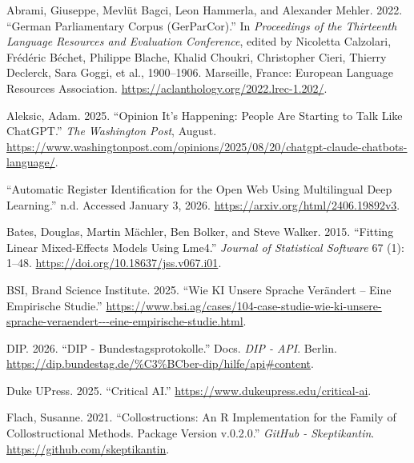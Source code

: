 \documentclass[
  letterpaper,
  DIV=11,
  numbers=noendperiod]{scrartcl}
\newlength{\cslhangindent}
\newenvironment{CSLReferences}[2] %
 {\begin{list}{}{%
  \setlength{\itemindent}{0pt}
  \setlength{\leftmargin}{0pt}
  \setlength{\parsep}{0pt}
  \ifodd #1
   \setlength{\leftmargin}{\cslhangindent}
   \setlength{\itemindent}{-1\cslhangindent}
  \fi
  \setlength{\itemsep}{#2\baselineskip}}}
 {\end{list}}
\begin{document}
\label{refs}
\begin{CSLReferences}{1}{0}
Abrami, Giuseppe, Mevlüt Bagci, Leon Hammerla, and Alexander Mehler.
2022. {``German {Parliamentary} {Corpus} ({GerParCor}).''} In
\emph{Proceedings of the {Thirteenth} {Language} {Resources} and
{Evaluation} {Conference}}, edited by Nicoletta Calzolari, Frédéric
Béchet, Philippe Blache, Khalid Choukri, Christopher Cieri, Thierry
Declerck, Sara Goggi, et al., 1900--1906. Marseille, France: European
Language Resources Association.
\url{https://aclanthology.org/2022.lrec-1.202/}.

Aleksic, Adam. 2025. {``Opinion {\textbar} {It}'s Happening: {People}
Are Starting to Talk Like {ChatGPT}.''} \emph{The Washington Post},
August.
\url{https://www.washingtonpost.com/opinions/2025/08/20/chatgpt-claude-chatbots-language/}.

{``Automatic Register Identification for the Open Web Using Multilingual
Deep Learning.''} n.d. Accessed January 3, 2026.
\url{https://arxiv.org/html/2406.19892v3}.

Bates, Douglas, Martin Mächler, Ben Bolker, and Steve Walker. 2015.
{``Fitting {Linear} {Mixed}-{Effects} {Models} {Using} Lme4.''}
\emph{Journal of Statistical Software} 67 (1): 1--48.
\url{https://doi.org/10.18637/jss.v067.i01}.

BSI, Brand Science Institute. 2025. {``Wie {KI} Unsere {Sprache}
Verändert -- {Eine} Empirische {Studie}.''}
\url{https://www.bsi.ag/cases/104-case-studie-wie-ki-unsere-sprache-veraendert---eine-empirische-studie.html}.

DIP. 2026. {``{DIP} - {Bundestagsprotokolle}.''} Docs. \emph{DIP - API}.
Berlin.
\url{https://dip.bundestag.de/\%C3\%BCber-dip/hilfe/api\#content}.

Duke UPress. 2025. {``Critical {AI}.''}
\url{https://www.dukeupress.edu/critical-ai}.

Flach, Susanne. 2021. {``Collostructions: {An} {R} Implementation for
the Family of Collostructional Methods. {Package} Version v.0.2.0.''}
\emph{GitHub - Skeptikantin}. \url{https://github.com/skeptikantin}.


\end{CSLReferences}
\end{document}
